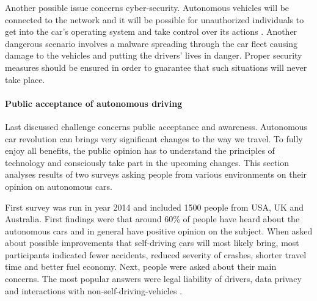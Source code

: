 \documentclass[11pt,english]{article}
\begin{document}
\par

Another possible issue concerns cyber-security. Autonomous vehicles  will be connected to the network and it will be possible for unauthorized individuals to get into the car's operating system and take control over its actions \citep{douma2012criminal}. Another dangerous scenario involves a malware spreading through the car fleet causing damage to the vehicles and putting the drivers’ lives in danger. Proper security measures should be ensured in order to guarantee that such situations will never take place.















\paragraph{Public acceptance of autonomous driving}

\par

Last discussed challenge concerns public acceptance and awareness. Autonomous car revolution can brings very significant changes to the way we travel. To fully enjoy all benefits, the public opinion has to understand the principles of technology and consciously take part in the upcoming changes. This section analyses results of two surveys asking people from various environments on their opinion on autonomous cars.

\par
First survey was run in year 2014 and included 1500 people from USA, UK and Australia. First findings were that around 60\% of people have heard about the autonomous cars and in general have positive opinion on the subject. When asked about possible improvements that self-driving cars will most likely bring, most participants indicated fewer accidents, reduced severity of crashes, shorter travel time and better fuel economy. Next, people were asked about their main concerns. The most popular answers were legal liability of drivers, data privacy and interactions with non-self-driving-vehicles \citep{schoettle2014survey}.
\end{document}
